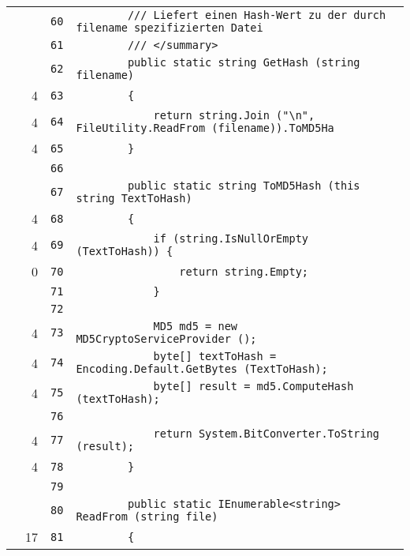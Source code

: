 \documentclass[a4paper,10pt]{article}
\begin{document}
\begin{longtable}[l]{lrrl}
\cellcolor{gray} &  & \verb~60~ & \verb~        /// Liefert einen Hash-Wert zu der durch filename spezifizierten Datei~\\
\cellcolor{gray} &  & \verb~61~ & \verb~        /// </summary>~\\
\cellcolor{gray} &  & \verb~62~ & \verb~        public static string GetHash (string filename)~\\
\cellcolor{green} & 4 & \verb~63~ & \verb~        {~\\
\cellcolor{green} & 4 & \verb~64~ & \verb~            return string.Join ("\n", FileUtility.ReadFrom (filename)).ToMD5Ha~\\
\cellcolor{green} & 4 & \verb~65~ & \verb~        }~\\
\cellcolor{gray} &  & \verb~66~ & \verb~~\\
\cellcolor{gray} &  & \verb~67~ & \verb~        public static string ToMD5Hash (this string TextToHash)~\\
\cellcolor{green} & 4 & \verb~68~ & \verb~        {~\\
\cellcolor{green} & 4 & \verb~69~ & \verb~            if (string.IsNullOrEmpty (TextToHash)) {~\\
\cellcolor{red} & 0 & \verb~70~ & \verb~                return string.Empty;~\\
\cellcolor{gray} &  & \verb~71~ & \verb~            }~\\
\cellcolor{gray} &  & \verb~72~ & \verb~~\\
\cellcolor{green} & 4 & \verb~73~ & \verb~            MD5 md5 = new MD5CryptoServiceProvider ();~\\
\cellcolor{green} & 4 & \verb~74~ & \verb~            byte[] textToHash = Encoding.Default.GetBytes (TextToHash);~\\
\cellcolor{green} & 4 & \verb~75~ & \verb~            byte[] result = md5.ComputeHash (textToHash);~\\
\cellcolor{gray} &  & \verb~76~ & \verb~~\\
\cellcolor{green} & 4 & \verb~77~ & \verb~            return System.BitConverter.ToString (result);~\\
\cellcolor{green} & 4 & \verb~78~ & \verb~        }~\\
\cellcolor{gray} &  & \verb~79~ & \verb~~\\
\cellcolor{gray} &  & \verb~80~ & \verb~        public static IEnumerable<string> ReadFrom (string file)~\\
\cellcolor{green} & 17 & \verb~81~ & \verb~        {~\\

\end{longtable}
\end{document}
